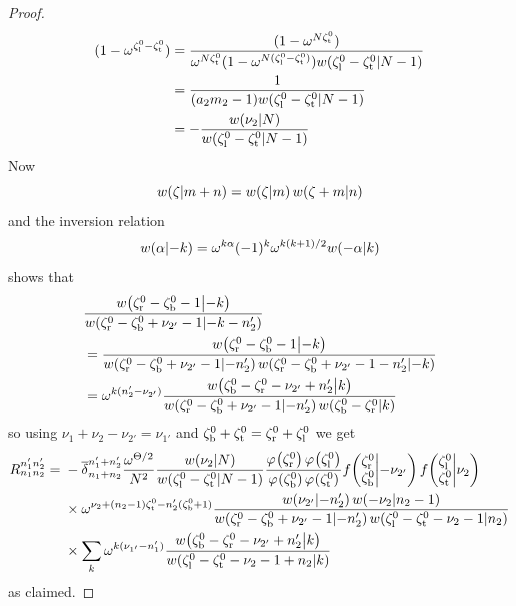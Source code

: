 \documentclass{sl2ams}
\numberwithin{equation}{section}
\begin{document}
\begin{proof}
\begin{align*}
{      (1 - \omega^{\zeta_{\mathrm{l}}^{0} - \zeta_{\mathrm{t}}^0})
    }
    &=
    \frac{
      (1 - \omega^{N\zeta_{\mathrm{t}}^0})
    }{
      \omega^{N \zeta_{\mathrm{t}}^0}
      (1 - \omega^{N(\zeta_{\mathrm{l}}^{0} - \zeta_{\mathrm{t}}^0)})
      w\mathopen{}\left(\zeta_{\mathrm{l}}^{0} - \zeta_{\mathrm{t}}^{0} \middle | N - 1 \right)
    }
    \\
    &=
    \frac{
      1
      }{
        (a_{2} m_{2} - 1)
      w\mathopen{}\left(\zeta_{\mathrm{l}}^{0} - \zeta_{\mathrm{t}}^{0} \middle | N - 1 \right)
    }
    \\
    &=
    -
    \frac{
      w\mathopen{}\left(\nu_{2} \middle | N \right)
      }{
      w\mathopen{}\left(\zeta_{\mathrm{l}}^{0} - \zeta_{\mathrm{t}}^{0} \middle | N - 1 \right)
    }
  \end{align*}
  Now
  \[
    w\mathopen{}\left(\zeta \middle | m + n \right) = w\mathopen{}\left(\zeta \middle | m \right)w\mathopen{}\left(\zeta+m \middle | n \right)
  \]
  and the inversion relation
  \[
    w\mathopen{}\left(\alpha \middle | -k \right)
    =
    \omega^{k \alpha} (-1)^{k} \omega^{k(k+1)/2} w\mathopen{}\left(-\alpha \middle | k \right)
  \]
  shows that
  \begin{align*}
    &\frac{
      w\mathopen{}\left(\zeta_{\mathrm{r}}^0 - \zeta_{\mathrm{b}}^0- 1 \middle | -k \right)
    }{
      w\mathopen{}\left(\zeta_{\mathrm{r}}^0 - \zeta_{\mathrm{b}}^0 + \nu_{2'} - 1 \middle | -k - n_2' \right)
    }
    \\
    &=
    \frac{
      w\mathopen{}\left(\zeta_{\mathrm{r}}^0 - \zeta_{\mathrm{b}}^0- 1 \middle | -k \right)
    }{
      w\mathopen{}\left(\zeta_{\mathrm{r}}^0 - \zeta_{\mathrm{b}}^0 + \nu_{2'} - 1 \middle | - n_2' \right)
      w\mathopen{}\left(\zeta_{\mathrm{r}}^0 - \zeta_{\mathrm{b}}^0 + \nu_{2'} - 1 - n_{2}' \middle | -k  \right)
    }
    \\
    &=
    \omega^{k(n_{2}' - \nu_{2'})}
    \frac{
      w\mathopen{}\left(\zeta_{\mathrm{b}}^0 - \zeta_{\mathrm{r}}^0 - \nu_{2'} + n_{2}' \middle | k  \right)
    }{
      w\mathopen{}\left(\zeta_{\mathrm{r}}^0 - \zeta_{\mathrm{b}}^0 + \nu_{2'} - 1 \middle | - n_2' \right)
      w\mathopen{}\left(\zeta_{\mathrm{b}}^0 - \zeta_{\mathrm{r}}^0 \middle | k \right)
    }
  \end{align*}
  so using \(\nu_{1} + \nu_{2} - \nu_{2'} = \nu_{1'}\) and \(\zeta_{\mathrm{b}}^{0} + \zeta_{\mathrm{t}}^{0} = \zeta_{\mathrm{r}}^0 + \zeta_{\mathrm{l}}^0\) we get
  \begin{align*}
      R_{n_1 n_2}^{n_1' n_2'}
      =
      {}
      &
      -
      \nrdel{n_1 + n_2}{n_1' +  n_2'}
      \frac{
        \omega^{\Theta/2}
      }{
        \nr^{2}
      }
      \frac{
        \qlog{\nu_{2}}{\nr}
      }{
        \qlog{\zeta_{\lS}^{0} - \zeta_{\lW}^{0}}{\nr - 1}
      }
      \frac{
        \pf{\zeta_{\lN}^0}
        \pf{\zeta_{\lS}^0}
      }{
        \pf{\zeta_{\lE}^0}
        \pf{\zeta_{\lW}^0}
      }
      \fstack{\zeta_{\lN}^0 }{\zeta_{\lE}^0}{- \nu_{2'}}
      \fstack{\zeta_{\lS}^0 }{\zeta_{\lW}^0}{\nu_{2}}
      \\
      &\times
      \omega^{\nu_{2} + (n_{2} - 1) \zeta_{\lW}^{0} - n_{2}' (\zeta_{\lE}^{0} + 1) }
      \frac{
        \qlog{\nu_{2'}}{-n_2'}
        \qlog{-\nu_{2}}{n_2 - 1}
        }{
        \qlog{\zeta_{\lN}^0 - \zeta_{\lE}^0 + \nu_{2'} - 1}{- n_2'}
        \qlog{\zeta_{\lS}^0 - \zeta_{\lW}^0 - \nu_{2} - 1}{n_2 }
      }
      \\
      &\times
      \sum_{k}
        \omega^{k(\nu_{1'} - n_1' )}
      \frac{
        \qlog{\zeta_{\lE}^0 - \zeta_{\lN}^0 - \nu_{2'} + n_{2}'}{k }
      }{
        \qlog{\zeta_{\lS}^0 - \zeta_{\lW}^0 - \nu_{2} - 1+ n_2 }{k }
      }
  \end{align*}
  as claimed.
\end{proof}
\end{document}
